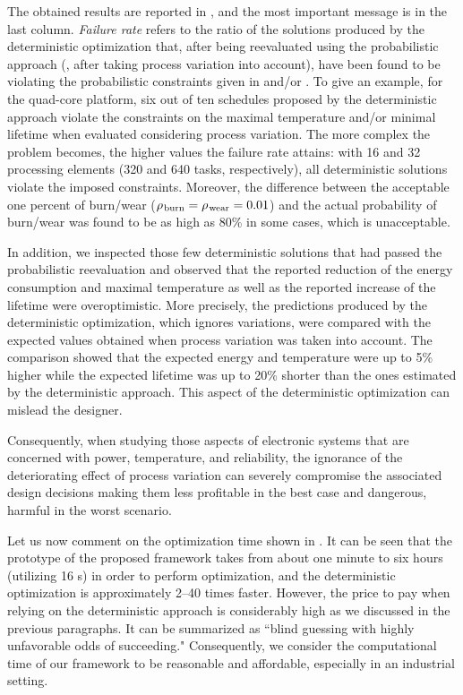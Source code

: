 The obtained results are reported in , and the most important message is in the last column.
\emph{Failure rate} refers to the ratio of the solutions produced by the deterministic optimization that, after being reevaluated using the probabilistic approach (\ie, after taking process variation into account), have been found to be violating the probabilistic constraints given in  and/or .
To give an example, for the quad-core platform, six out of ten schedules proposed by the deterministic approach violate the constraints on the maximal temperature and/or minimal lifetime when evaluated considering process variation.
The more complex the problem becomes, the higher values the failure rate attains: with 16 and 32 processing elements (320 and 640 tasks, respectively), all deterministic solutions violate the imposed constraints.
Moreover, the difference between the acceptable one percent of burn/wear ($\rho_{\text{\kern0.1emburn}} = \rho_{\text{\kern0.1emwear}} = 0.01$) and the actual probability of burn/wear was found to be as high as 80\% in some cases, which is unacceptable.

In addition, we inspected those few deterministic solutions that had passed the probabilistic reevaluation and observed that the reported reduction of the energy consumption and maximal temperature as well as the reported increase of the lifetime were overoptimistic.
More precisely, the predictions produced by the deterministic optimization, which ignores variations, were compared with the expected values obtained when process variation was taken into account.
The comparison showed that the expected energy and temperature were up to 5\% higher while the expected lifetime was up to 20\% shorter than the ones estimated by the deterministic approach.
This aspect of the deterministic optimization can mislead the designer.

Consequently, when studying those aspects of electronic systems that are concerned with power, temperature, and reliability, the ignorance of the deteriorating effect of process variation can severely compromise the associated design decisions making them less profitable in the best case and dangerous, harmful in the worst scenario.

Let us now comment on the optimization time shown in .
It can be seen that the prototype of the proposed framework takes from about one minute to six hours (utilizing 16 s) in order to perform optimization, and the deterministic optimization is approximately 2--40 times faster.
However, the price to pay when relying on the deterministic approach is considerably high as we discussed in the previous paragraphs.
It can be summarized as ``blind guessing with highly unfavorable odds of succeeding."
Consequently, we consider the computational time of our framework to be reasonable and affordable, especially in an industrial setting.

